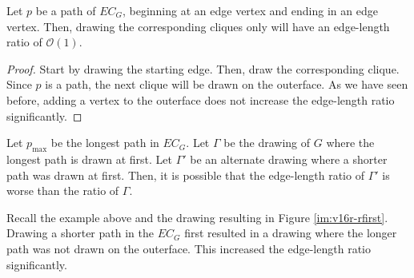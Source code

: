 \begin{lemma}
	Let $p$ be a path of $EC_G$, beginning at an edge vertex and ending in an edge vertex. Then, drawing the corresponding cliques only will have an edge-length ratio of $\mathcal{O}(1)$.
\end{lemma}
\begin{proof}
	Start by drawing the starting edge. Then, draw the corresponding clique. Since $p$ is a path, the next clique will be drawn on the outerface. As we have seen before, adding a vertex to the outerface does not increase the edge-length ratio significantly.
\end{proof}
\begin{observation}
	Let $p_{\max}$ be the longest path in $EC_G$. Let $\Gamma$ be the drawing of $G$ where the longest path is drawn at first. Let $\Gamma'$ be an alternate drawing where a shorter path was drawn at first. Then, it is possible that the edge-length ratio of $\Gamma'$ is worse than the ratio of $\Gamma$.
\end{observation}
Recall the example above and the drawing resulting in Figure \ref{im:v16r-rfirst}. Drawing a shorter path in the $EC_G$ first resulted in a drawing where the longer path was not drawn on the outerface. This increased the edge-length ratio significantly.
